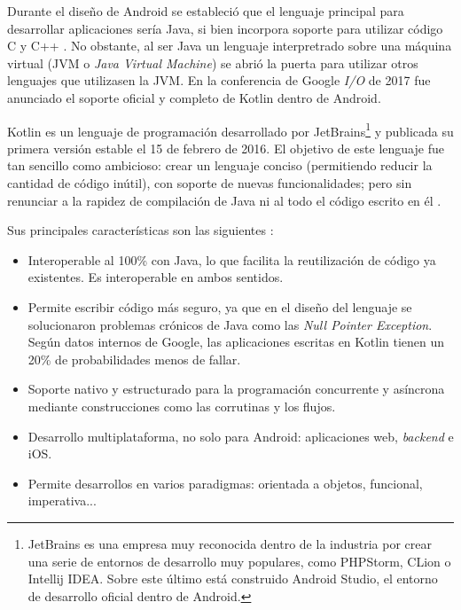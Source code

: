             Durante el diseño de Android se estableció que el lenguaje principal para desarrollar aplicaciones sería 
            Java, si bien incorpora soporte para utilizar código C y C++ \cite{android_developers_como_nodate}. No
            obstante, al ser Java un lenguaje interpretrado sobre una máquina virtual (JVM o \textit{Java Virtual
            Machine}) se abrió la puerta para  utilizar otros lenguajes que utilizasen la JVM. En la conferencia de 
            Google \textit{I/O} de 2017 fue anunciado el soporte oficial y completo 
            de Kotlin dentro de Android. \newline

            Kotlin es un lenguaje de programación desarrollado por JetBrains\footnote{JetBrains es una
            empresa muy reconocida dentro de la industria por crear una serie de entornos de desarrollo muy populares,
            como PHPStorm, CLion o Intellij IDEA. Sobre este último está construido Android Studio, el entorno de 
            desarrollo oficial dentro de Android.} y publicada su primera versión estable el 15 de febrero de 2016.
            El objetivo de este lenguaje fue tan sencillo como ambicioso: crear un lenguaje conciso (permitiendo reducir
            la cantidad de código inútil), con soporte de nuevas funcionalidades; pero sin renunciar a la rapidez de
            compilación de Java ni al todo el código escrito en él 
            \cite{rao_k_history_nodate}. \newline

            Sus principales características son las siguientes \cite{noauthor_kotlin_nodate} \cite{noauthor_enfoque_nodate}:
            \begin{itemize}
                \item Interoperable al 100\% con Java, lo que facilita la reutilización de código ya existentes. 
                Es interoperable en ambos sentidos.
                \item Permite escribir código más seguro, ya que en el diseño del lenguaje se solucionaron problemas
                crónicos de Java como las \textit{Null Pointer Exception}. Según datos internos de Google, las 
                aplicaciones escritas en Kotlin tienen un 20\% de probabilidades menos de fallar.
                \item Soporte nativo y estructurado para la programación concurrente y asíncrona mediante 
                construcciones como las corrutinas y los flujos.
                \item Desarrollo multiplataforma, no solo para Android: aplicaciones web, \textit{backend} e iOS.
                \item Permite desarrollos en varios paradigmas: orientada a objetos, funcional, imperativa...
            \end{itemize}
            
